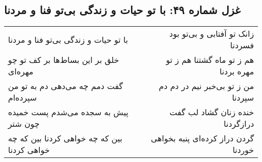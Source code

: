 \begin{center}
\section*{غزل شماره ۴۹: با تو حیات و زندگی بی‌تو فنا و مردنا}
\label{sec:0049}
\begin{longtable}{l p{0.5cm} r}
با تو حیات و زندگی بی‌تو فنا و مردنا
&&
زانک تو آفتابی و بی‌تو بود فسردنا
\\
خلق بر این بساط‌ها بر کف تو چو مهره‌ای
&&
هم ز تو ماه گشتنا هم ز تو مهره بردنا
\\
گفت دمم چه می‌دهی دم به تو من سپرده‌ام
&&
من ز تو بی‌خبر نیم در دم دم سپردنا
\\
پیش به سجده می‌شدم پست خمیده چون شتر
&&
خنده زنان گشاد لب گفت درازگردنا
\\
بین که چه خواهی کردنا بین که چه خواهی کردنا
&&
گردن دراز کرده‌ای پنبه بخواهی خوردنا
\\
\end{longtable}
\end{center}
